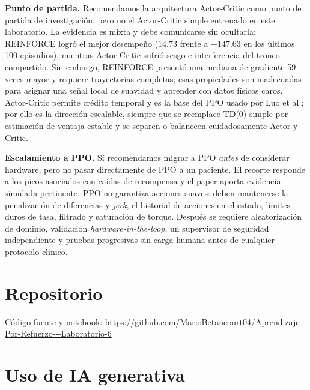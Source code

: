 \documentclass[11pt,letterpaper]{article}
\newcommand{\lead}[1]{\textbf{#1}}
\begin{document}
\begin{respuesta}
\lead{Punto de partida.} Recomendamos la arquitectura Actor-Critic como punto de partida
de investigación, pero no el Actor-Critic simple entrenado en este laboratorio. La
evidencia es mixta y debe comunicarse sin ocultarla: REINFORCE logró el mejor desempeño
($14.73$ frente a $-147.63$ en los últimos 100 episodios), mientras Actor-Critic sufrió
sesgo e interferencia del tronco compartido. Sin embargo, REINFORCE presentó una mediana
de gradiente 59 veces mayor y requiere trayectorias completas; esas propiedades son
inadecuadas para asignar una señal local de suavidad y aprender con datos físicos caros.
Actor-Critic permite crédito temporal y es la base del PPO usado por Luo et al.; por
ello es la dirección escalable, siempre que se reemplace TD(0) simple por estimación de
ventaja estable y se separen o balanceen cuidadosamente Actor y Critic.

\medskip
\lead{Escalamiento a PPO.} Sí recomendamos migrar a PPO \emph{antes} de considerar
hardware, pero no pasar directamente de PPO a un paciente. El recorte responde a los
picos asociados con caídas de recompensa y el paper aporta evidencia simulada pertinente.
PPO no garantiza acciones suaves: deben mantenerse la penalización de diferencias y
\textit{jerk}, el historial de acciones en el estado, límites duros de tasa, filtrado y
saturación de torque. Después se requiere aleatorización de dominio, validación
\textit{hardware-in-the-loop}, un supervisor de seguridad independiente y pruebas
progresivas sin carga humana antes de cualquier protocolo clínico.
\end{respuesta}

\section{Repositorio}

\begin{respuesta}
Código fuente y notebook:
\url{https://github.com/MarioBetancourt04/Aprendizaje-Por-Refuerzo---Laboratorio-6}
\end{respuesta}

\section{Uso de IA generativa}
\end{document}
